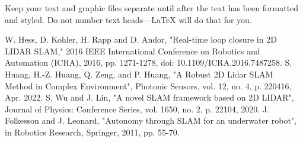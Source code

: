 \documentclass[conference]{IEEEtran}
\begin{document}
Keep your text and graphic files separate until after the text has been 
formatted and styled. Do not number text heads---{\LaTeX} will do that 
for you.

\begin{thebibliography}{00}
 W. Hess, D. Kohler, H. Rapp and D. Andor, "Real-time loop closure in 2D LIDAR SLAM," 2016 IEEE International Conference on Robotics and Automation (ICRA), 2016, pp. 1271-1278, doi: 10.1109/ICRA.2016.7487258.
 S. Huang, H.-Z. Huang, Q. Zeng, and P. Huang, "A Robust 2D Lidar SLAM Method in Complex Environment", Photonic Sensors, vol. 12, no. 4, p. 220416, Apr. 2022.
 S. Wu and J. Lin, "A novel SLAM framework based on 2D LIDAR", Journal of Physics: Conference Series, vol. 1650, no. 2, p. 22104, 2020.
 J. Folkesson and J. Leonard, "Autonomy through SLAM for an underwater robot", in Robotics Research, Springer, 2011, pp. 55-70.
\end{thebibliography}
\vspace{12pt}
\end{document}
